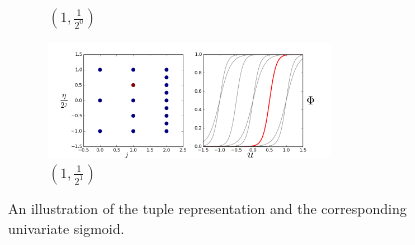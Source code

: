 \begin{figure}[htbp]
\begin{center}
\begin{subfigure}[t]{.48\textwidth}
        \caption{$\left(1, \frac{1}{2^0}\right)$}
        \label{fig: basis 2}
    \end{subfigure}
    \begin{subfigure}[t]{.48\textwidth}
        \centering
        \includegraphics[width=7.5cm]{../basis_6.png}
        \caption{$\left(1, \frac{1}{2^1}\right)$}
        \label{fig: basis 3}
    \end{subfigure}
    \caption{An illustration of the tuple representation and the corresponding univariate sigmoid.}
\end{center}\end{figure}

